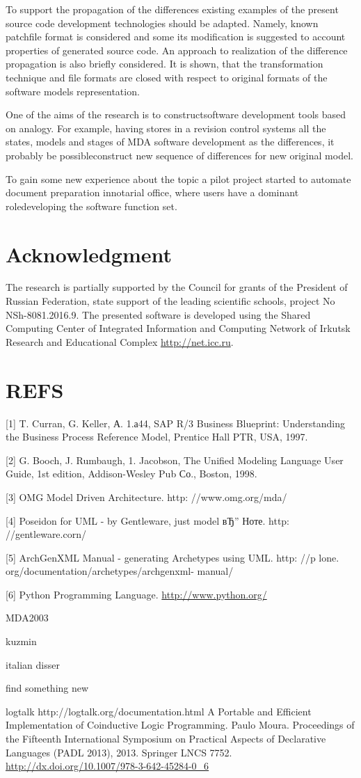 \documentclass{intech}
\begin{document}
To support the propagation of the differences existing examples of the present source code development technologies should be adapted. Namely, known patchfile format is considered and some its modification is suggested to account properties of generated source code. An approach to realization of the difference propagation is also briefly considered. It is shown, that the transformation technique and file formats are closed with respect to original formats of the software models representation.

One of the aims of the research is to constructsoftware development tools based on analogy. For example, having stores in a revision control systems all the states, models and stages of MDA software development as the differences, it probably be possibleconstruct new sequence of differences for new original model.

To gain some new experience about the topic a pilot project started to automate document preparation innotarial office, where users have a dominant roledeveloping the software function set.

\section{Acknowledgment}

The research is partially supported by the Council for grants of the President of Russian Federation, state support of the leading scientific schools, project No NSh-8081.2016.9.  The presented software is developed using the Shared Computing Center of Integrated Information and Computing Network of Irkutsk Research and Educational Complex \url{http://net.icc.ru}.


\section{REFS}
\label{sec:refs-tmp}

[1] T. Curran, G. Keller, А. 1.а44, SAP R/3 Business Blueprint:
Understanding the Business Process Reference Model,
Prentice Hall PTR, USA, 1997.

[2] G. Booch, J. Rumbaugh, 1. Jacobson, The Unified Modeling
Language User Guide, 1st edition, Addison-Wesley Pub
Со., Boston, 1998.

[3] OMG Model Driven Architecture. http: //www.omg.org/mda/

[4] Poseidon for UML - by Gentleware, just model вЂ” Ноте.
http: //gentleware.corn/

[5] ArchGenXML Manual - generating Archetypes using UML.
http: //p lone. org/documentation/archetypes/archgenxml-
manual/

[6] Python Programming Language. \url{http://www.python.org/}

MDA2003

kuzmin

italian disser

find something new

logtalk http://logtalk.org/documentation.html A Portable and Efficient Implementation of Coinductive Logic Programming. Paulo Moura. Proceedings of the Fifteenth International Symposium on Practical Aspects of Declarative Languages (PADL 2013), 2013. Springer LNCS 7752. \url{http://dx.doi.org/10.1007/978-3-642-45284-0_6}
\end{document}
